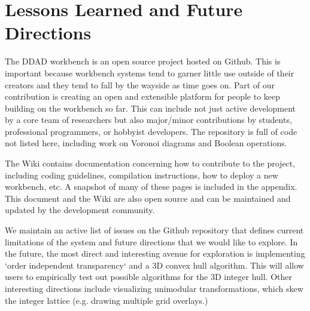 \FloatBarrier
\section{Lessons Learned and Future Directions} 
\label{sec:lessons-learned}

The DDAD workbench is an open source project hosted on Github. This is important
because workbench systems tend to garner little use outside of their creators
and they tend to fall by the wayside as time goes on. Part of our contribution
is creating an open and extensible platform for people to keep building on the
workbench so far. This can include not just active development by a core team of
researchers but also major/minor contributions by students, professional
programmers, or hobbyist developers. The repository is full of code not
listed here, including work on Voronoi diagrams and Boolean operations. 

The Wiki contains documentation concerning how to contribute to the project,
including coding guidelines, compilation instructions, how to deploy
a new workbench, etc. A snapshot of many of these pages is included in the
appendix. This document and the Wiki are also open source and can be maintained
and updated by the development community.

We maintain an active list of issues on the Github repository that defines
current limitations of the system and future directions that we would like to
explore. In the future, the most direct and interesting avenue for exploration
is implementing `order independent transparency` and a 3D convex hull algorithm.
This will allow users to empirically test out possible algorithms for the 3D
integer hull. Other interesting directions include visualizing unimodular
transformations, which skew the integer lattice (e.g. drawing multiple grid
overlays.)


% 	

